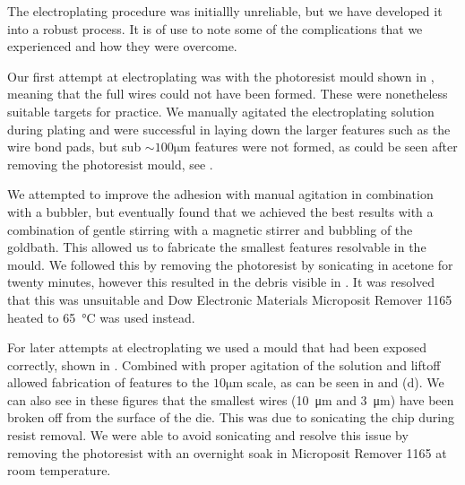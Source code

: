The electroplating procedure was initiallly unreliable, but we have developed
it into a robust process. It is of use to note some of the complications
that we experienced and how they were overcome. 

Our first attempt at electroplating was with the photoresist mould shown in
, meaning that the full wires could not have
been formed. These were nonetheless suitable targets for practice. We manually
agitated the electroplating solution during plating and were successful in
laying down the larger features such as the wire bond pads, but sub
$\sim100\si{\micro\meter}$ features were not formed, as could be seen after
removing the photoresist mould, see .

We attempted to improve the adhesion with manual agitation in combination with
a bubbler, but eventually found that we achieved the best results with a
combination of gentle stirring with a magnetic stirrer and bubbling of the
goldbath. This allowed us to fabricate the smallest features resolvable in the
mould. We followed this by removing the photoresist by sonicating in acetone
for twenty minutes, however this resulted in the debris visible in
. It was resolved that this was unsuitable
and Dow Electronic Materials Microposit Remover 1165 heated to
\SI{65}{\celsius} was used instead. 

For later attempts at electroplating we used a mould that had been exposed
correctly, shown in . Combined with proper
agitation of the solution and liftoff allowed fabrication of features to the
$10\si{\micro\meter}$ scale, as can be seen in
 and (d). We can also see in these figures
that the smallest wires (\SI{10}{\micro\meter} and \SI{3}{\micro\meter}) have
been broken off from the surface of the die. This was due to sonicating the
chip during resist removal. We were able to avoid sonicating and resolve this
issue by removing the photoresist with an overnight soak in Microposit Remover
1165 at room temperature.


